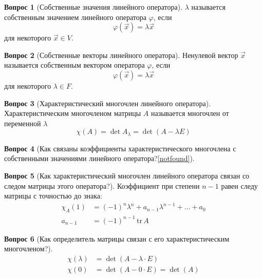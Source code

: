 \documentclass[a4paper,11pt]{article}
\theoremstyle{remark}
\theoremstyle{definition}
\newtheorem{question}{Вопрос}
\begin{document}
\begin{question}[Собственные значения линейного оператора]
\(\lambda\) называется собственным значением линейного оператора \(\varphi\), если
\begin{equation*}
	\varphi(\vec{x}) = \lambda\vec{x}
\end{equation*}
для некоторого \(\vec{x} \in V\).
\end{question}


\begin{question}[Собственные векторы линейного оператора]
Ненулевой вектор \(\vec{x}\) называется собственным вектором оператора \(\varphi\), если
\begin{equation*}
	\varphi(\vec{x}) = \lambda\vec{x}
\end{equation*}
для некоторого \(\lambda \in F\).
\end{question}


\begin{question}[Характеристический многочлен линейного оператора]
Характеристическим многочленом матрицы \(A\) называется многочлен от переменной \(\lambda\)
\begin{equation*}
	\chi(A) = \det A_{\lambda} = \det (A - \lambda{}E)
\end{equation*}
\end{question}


\begin{question}[Как связаны коэффициенты характеристического многочлена с собственными значениями линейного оператора?\cref{notfound}]
\end{question}


\begin{question}[Как характеристический многочлен линейного оператора связан со следом матрицы этого оператора?]
Коэффициент при степени \(n-1\) равен следу матрицы с точностью до знака:
\begin{align*}
	\chi_A(1) &= (-1)^n\lambda^n + a_{n-1}\lambda^{n-1} + \dots + a_0 \\
	a_{n-1} &= (-1)^{n-1}\,\mathrm{tr}\,A
\end{align*}
\end{question}


\begin{question}[Как определитель матрицы связан с его характеристическим многочленом?]
\begin{align*}
	\chi(\lambda) &= \det (A - \lambda \cdot E)\\
	\chi(0) &= \det (A - 0 \cdot E) = \det (A)	
\end{align*}
\end{question}
\end{document}
